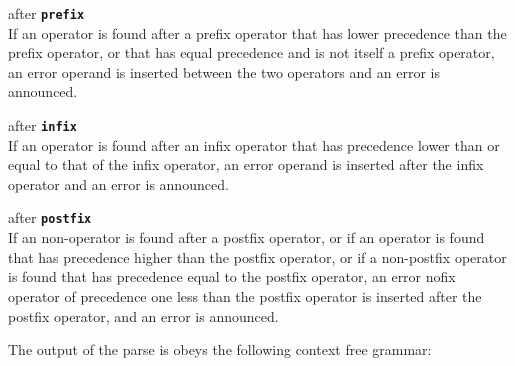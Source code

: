 \documentclass[12pt]{article}
\newcommand{\ttkey}[1]{{\tt \bfseries #1}}
\newenvironment{indpar}[1][0.3in]%
	{\begin{list}{}%
		     {\setlength{\itemsep}{0in}%
		      \setlength{\topsep}{0in}%
		      \setlength{\parsep}{1ex}%
		      \setlength{\labelwidth}{#1}%
		      \setlength{\leftmargin}{#1}%
		      \addtolength{\leftmargin}{\labelsep}}%
	 \item}%
	{\end{list}}
\begin{document}
\begin{indpar}[0.5in]
\hspace*{-0.3in}after \ttkey{prefix} \\
If an operator is found after a prefix operator that has lower
precedence than the prefix operator, or that has equal precedence
and is not itself a prefix operator, an error operand is inserted
between the two operators and an error is announced.

\hspace*{-0.3in}after \ttkey{infix} \\
If an operator is found after an infix operator that has
precedence lower than or equal to that of the infix operator,
an error operand is inserted
after the infix operator and an error is announced.

\hspace*{-0.3in}after \ttkey{postfix} \\
If an non-operator is found after a postfix operator,
or if an operator is found that has
precedence higher than the postfix operator,
or if a non-postfix operator is found that has
precedence equal to the postfix operator,
an error nofix operator of precedence one less than the
postfix operator is inserted after the postfix operator,
and an error is announced.

\end{indpar}

The output of the parse is obeys the following context
free grammar:
\end{document}

